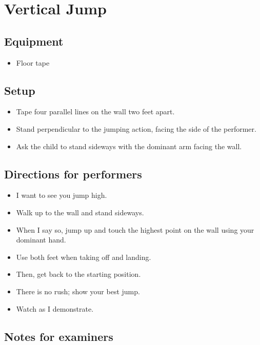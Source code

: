 \documentclass[
  letterpaper,
  DIV=11,
  numbers=noendperiod]{scrreprt}
\providecommand{\tightlist}{%
  \setlength{\itemsep}{0pt}\setlength{\parskip}{0pt}}
\begin{document}
\section{Vertical Jump}\label{vertical-jump}

\subsection{Equipment}\label{equipment-9}

\begin{itemize}
\tightlist
\item
  Floor tape
\end{itemize}

\subsection{Setup}\label{setup-8}

\begin{itemize}
\tightlist
\item
  Tape four parallel lines on the wall two feet apart.
\item
  Stand perpendicular to the jumping action, facing the side of the
  performer.
\item
  Ask the child to stand sideways with the dominant arm facing the wall.
\end{itemize}

\subsection{Directions for
performers}\label{directions-for-performers-8}

\begin{itemize}
\tightlist
\item
  I want to see you jump high.
\item
  Walk up to the wall and stand sideways.
\item
  When I say so, jump up and touch the highest point on the wall using
  your dominant hand.
\item
  Use both feet when taking off and landing.
\item
  Then, get back to the starting position.
\item
  There is no rush; show your best jump.
\item
  Watch as I demonstrate.
\end{itemize}

\subsection{Notes for examiners}\label{notes-for-examiners-8}
\end{document}
